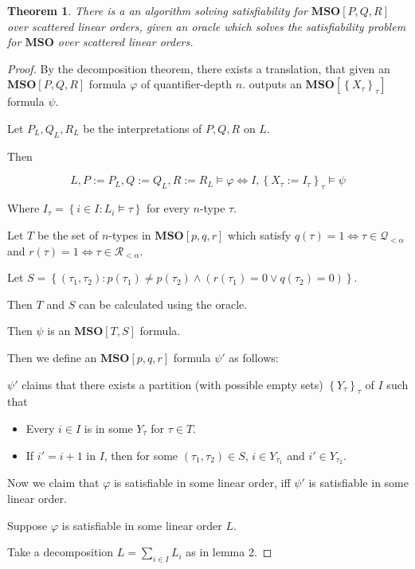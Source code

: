 \documentclass{article}
\newtheorem{theorem}{Theorem}
\newcommand{\braces}[1]{\left\{ {#1} \right\}}
\newcommand{\setcomp}[1]{\braces{#1}}
\newcommand{\mso}{\mathbf{MSO}}
\begin{document}
\begin{theorem}
  There is a an algorithm solving satisfiability for $\mso[P, Q, R]$ over scattered linear orders,
  given an oracle which solves the satisfiability problem for $\mso$ over scattered linear orders.
\end{theorem}

\begin{proof}
  By the decomposition theorem, there exists a translation,
  that given an $\mso[P, Q, R]$ formula $\varphi$ of quantifier-depth $n$.
  outputs an $\mso[\setcomp{X_\tau}_\tau]$ formula $\psi$.

  Let $P_L, Q_L, R_L$ be the interpretations of $P, Q, R$ on $L$.

  Then

  $$
    L, P := P_L, Q := Q_L, R := R_L \models \varphi \iff I, \setcomp{X_\tau := I_\tau}_\tau \models \psi
  $$

  Where $I_\tau = \setcomp{i \in I : L_i \models \tau}$ for every $n$-type $\tau$.

  Let $T$ be the set of $n$-types in $\mso[p, q, r]$ which satisfy
  $q(\tau) = 1 \iff \tau \in \mathcal{Q}_{< \alpha}$ and $r(\tau) = 1 \iff \tau \in \mathcal{R}_{< \alpha}$.

  Let $S = \setcomp{(\tau_1, \tau_2) : p(\tau_1) \ne p(\tau_2) \land (r(\tau_1) = 0 \lor q(\tau_2) = 0)}$.

  Then $T$ and $S$ can be calculated using the oracle.

  Then $\psi$ is an $\mso[T, S]$ formula.

  Then we define an $\mso[p, q, r]$ formula $\psi'$ as follows:

  $\psi'$ claims that there exists a partition (with possible empty sets) $\setcomp{Y_\tau}_{\tau}$ of $I$ such that
  \begin{itemize}
    \item Every $i \in I$ is in some $Y_\tau$ for $\tau \in T$.
    \item If $i' = i+1$ in $I$, then for some $(\tau_1, \tau_2) \in S$, $i \in Y_{\tau_1}$ and $i' \in Y_{\tau_2}$.
  \end{itemize}

  Now we claim that $\varphi$ is satisfiable in some linear order, iff $\psi'$ is satisfiable in some
  linear order.
  
  Suppose $\varphi$ is satisfiable in some linear order $L$.

  Take a decomposition $L = \sum_{i \in I} L_i$ as in lemma 2.


\end{proof}
\end{document}
